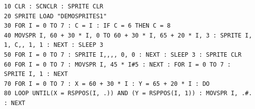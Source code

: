 \begin{description}[leftmargin=2cm,style=nextline]
\begin{tcolorbox}[colback=black,coltext=white]
\verbatimfont{\codefont}
\begin{verbatim}
10 CLR : SCNCLR : SPRITE CLR
20 SPRITE LOAD "DEMOSPRITES1"
30 FOR I = 0 TO 7 : C = I : IF C = 6 THEN C = 8
40 MOVSPR I, 60 + 30 * I, 0 TO 60 + 30 * I, 65 + 20 * I, 3 : SPRITE I, 1, C,, 1, 1 : NEXT : SLEEP 3
50 FOR I = 0 TO 7 : SPRITE I,,,, 0, 0 : NEXT : SLEEP 3 : SPRITE CLR
60 FOR I = 0 TO 7 : MOVSPR I, 45 * I#5 : NEXT : FOR I = 0 TO 7 : SPRITE I, 1 : NEXT
70 FOR I = 0 TO 7 : X = 60 + 30 * I : Y = 65 + 20 * I : DO
80 LOOP UNTIL(X = RSPPOS(I, .)) AND (Y = RSPPOS(I, 1)) : MOVSPR I, .#. : NEXT
\end{verbatim}
\end{tcolorbox}
\end{description}


\newpage
